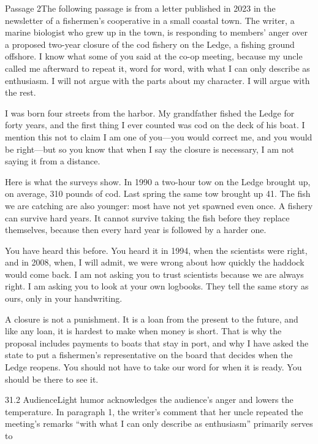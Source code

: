 \documentclass[11pt]{article}
\begin{document}
\begin{passage}{Passage 2}{The following passage is from a letter published in 2023 in the newsletter of a fishermen's cooperative in a small coastal town. The writer, a marine biologist who grew up in the town, is responding to members' anger over a proposed two-year closure of the cod fishery on the Ledge, a fishing ground offshore.}
 I know what some of you said at the co-op meeting, because my uncle called me afterward to repeat it, word for word, with what I can only describe as enthusiasm. I will not argue with the parts about my character. I will argue with the rest.

 I was born four streets from the harbor. My grandfather fished the Ledge for forty years, and the first thing I ever counted was cod on the deck of his boat. I mention this not to claim I am one of you---you would correct me, and you would be right---but so you know that when I say the closure is necessary, I am not saying it from a distance.

 Here is what the surveys show. In 1990 a two-hour tow on the Ledge brought up, on average, 310 pounds of cod. Last spring the same tow brought up 41. The fish we are catching are also younger: most have not yet spawned even once. A fishery can survive hard years. It cannot survive taking the fish before they replace themselves, because then every hard year is followed by a harder one.

 You have heard this before. You heard it in 1994, when the scientists were right, and in 2008, when, I will admit, we were wrong about how quickly the haddock would come back. I am not asking you to trust scientists because we are always right. I am asking you to look at your own logbooks. They tell the same story as ours, only in your handwriting.

 A closure is not a punishment. It is a loan from the present to the future, and like any loan, it is hardest to make when money is short. That is why the proposal includes payments to boats that stay in port, and why I have asked the state to put a fishermen's representative on the board that decides when the Ledge reopens. You should not have to take our word for when it is ready. You should be there to see it.
\end{passage}

\begin{q}{3}{1.2 Audience}{Light humor acknowledges the audience's anger and lowers the temperature.}
In paragraph 1, the writer's comment that her uncle repeated the meeting's remarks ``with what I can only describe as enthusiasm'' primarily serves to
\end{q}
\end{document}
